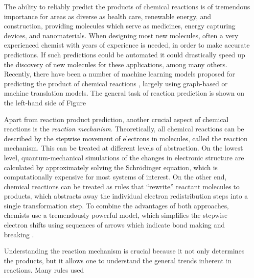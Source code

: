
The ability to reliably predict the products of chemical reactions is of tremendous importance for areas as diverse as health care, renewable energy, and construction, providing molecules which serve as medicines, energy capturing devices, and nanomaterials. 
When designing most new molecules, often a very experienced chemist with years of experience is needed, in order to make accurate predictions. 
If such predictions could be automated it could drastically speed up the discovery of new molecules for these applications, among many others. Recently, there have been a number of machine learning models proposed for predicting the product of chemical reactions \cite{coley2017prediction,jin2017predicting,neural-symbolic,schwaller2017found,wei2016neural,zhang2005structure}, largely using graph-based or machine translation models. The general task of reaction prediction is shown on the left-hand side of Figure

Apart from reaction product prediction, another crucial aspect of chemical reactions is the \emph{reaction mechanism}. Theoretically, all chemical reactions can be described by the stepwise movement of electrons in molecules, called the reaction mechanism.
This can be treated at different levels of abstraction. On the lowest level, quantum-mechanical simulations of the  changes in electronic structure are calculated by approximately solving the Schrödinger equation, which is computationally expensive for most systems of interest. 
On the other end, chemical reactions can be treated as rules that ``rewrite'' reactant molecules to products, which abstracts away the individual electron redistribution steps into a single transformation step. 
To combine the advantages of both approaches, chemists use a tremendously powerful model, which simplifies the stepwise electron shifts using sequences of arrows which indicate bond making and breaking \cite{herges1994organizing}. 

Understanding the reaction mechanism is crucial because it not only determines the products, but it allows one to understand the general trends inherent in reactions. Many rules used



